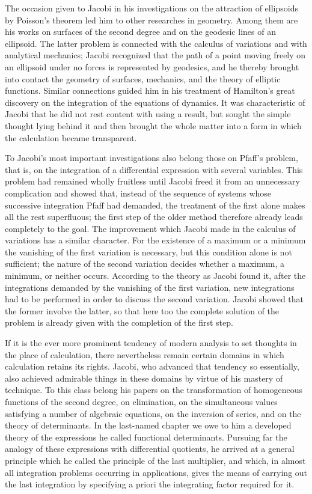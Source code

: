 \documentclass[11pt]{article}
\begin{document}
The occasion given to Jacobi in his investigations on the attraction of ellipsoids by Poisson's theorem led him to other researches in geometry. Among them are his works on surfaces of the second degree and on the geodesic lines of an ellipsoid. The latter problem is connected with the calculus of variations and with analytical mechanics; Jacobi recognized that the path of a point moving freely on an ellipsoid under no forces is represented by geodesics, and he thereby brought into contact the geometry of surfaces, mechanics, and the theory of elliptic functions. Similar connections guided him in his treatment of Hamilton's great discovery on the integration of the equations of dynamics. It was characteristic of Jacobi that he did not rest content with using a result, but sought the simple thought lying behind it and then brought the whole matter into a form in which the calculation became transparent.

To Jacobi's most important investigations also belong those on Pfaff's problem, that is, on the integration of a differential expression with several variables. This problem had remained wholly fruitless until Jacobi freed it from an unnecessary complication and showed that, instead of the sequence of systems whose successive integration Pfaff had demanded, the treatment of the first alone makes all the rest superfluous; the first step of the older method therefore already leads completely to the goal. The improvement which Jacobi made in the calculus of variations has a similar character. For the existence of a maximum or a minimum the vanishing of the first variation is necessary, but this condition alone is not sufficient; the nature of the second variation decides whether a maximum, a minimum, or neither occurs. According to the theory as Jacobi found it, after the integrations demanded by the vanishing of the first variation, new integrations had to be performed in order to discuss the second variation. Jacobi showed that the former involve the latter, so that here too the complete solution of the problem is already given with the completion of the first step.

If it is the ever more prominent tendency of modern analysis to set thoughts in the place of calculation, there nevertheless remain certain domains in which calculation retains its rights. Jacobi, who advanced that tendency so essentially, also achieved admirable things in these domains by virtue of his mastery of technique. To this class belong his papers on the transformation of homogeneous functions of the second degree, on elimination, on the simultaneous values satisfying a number of algebraic equations, on the inversion of series, and on the theory of determinants. In the last-named chapter we owe to him a developed theory of the expressions he called functional determinants. Pursuing far the analogy of these expressions with differential quotients, he arrived at a general principle which he called the principle of the last multiplier, and which, in almost all integration problems occurring in applications, gives the means of carrying out the last integration by specifying a priori the integrating factor required for it.
\end{document}
